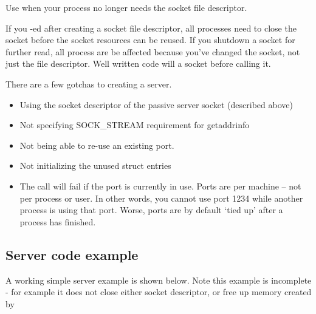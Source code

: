 \begin{enumerate}
  Use  when your process no longer needs the socket file descriptor.

  If you -ed after creating a socket file descriptor, all processes need to close the socket before the socket resources can be reused.
  If you shutdown a socket for further read, all process are be affected because you've changed the socket, not just the file descriptor.
  Well written code will  a socket before calling  it.

\end{enumerate}

There are a few gotchas to creating a server.

\begin{itemize}
\item
  Using the socket descriptor of the passive server socket (described above)
\item
  Not specifying SOCK\_STREAM requirement for getaddrinfo
\item
  Not being able to re-use an existing port.
\item
  Not initializing the unused struct entries
\item
  The  call will fail if the port is currently in use. Ports are per machine -- not per process or user.
  In other words, you cannot use port 1234 while another process is using that port.
  Worse, ports are by default `tied up' after a process has finished.
\end{itemize}

\subsection{Server code example}

A working simple server example is shown below.
Note this example is incomplete - for example it does not close either socket descriptor, or free up memory created by 

